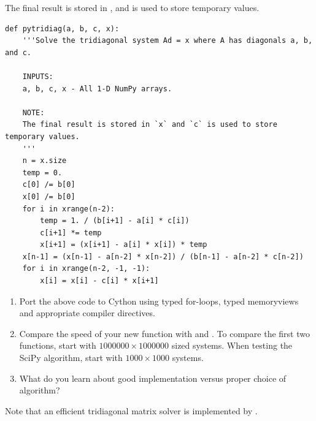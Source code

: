 The final result is stored in , and  is used to store temporary values.
\begin{lstlisting}
def pytridiag(a, b, c, x):
    '''Solve the tridiagonal system Ad = x where A has diagonals a, b, and c.
    
    INPUTS:
    a, b, c, x - All 1-D NumPy arrays.
    
    NOTE:
    The final result is stored in `x` and `c` is used to store temporary values.
    '''
    n = x.size
    temp = 0.
    c[0] /= b[0]
    x[0] /= b[0]
    for i in xrange(n-2):
        temp = 1. / (b[i+1] - a[i] * c[i])
        c[i+1] *= temp
        x[i+1] = (x[i+1] - a[i] * x[i]) * temp
    x[n-1] = (x[n-1] - a[n-2] * x[n-2]) / (b[n-1] - a[n-2] * c[n-2])
    for i in xrange(n-2, -1, -1):
        x[i] = x[i] - c[i] * x[i+1]
\end{lstlisting}

\begin{problem}
\leavevmode
\begin{enumerate}
\item Port the above code to Cython using typed for-loops, typed memoryviews and appropriate compiler directives.
\item Compare the speed of your new function with  and .
To compare the first two functions, start with $1000000 \times 1000000$ sized systems.
When testing the SciPy algorithm, start with $1000 \times 1000$ systems.
\item What do you learn about good implementation versus proper choice of algorithm?
\end{enumerate}
Note that an efficient tridiagonal matrix solver is implemented by .
\end{problem}


